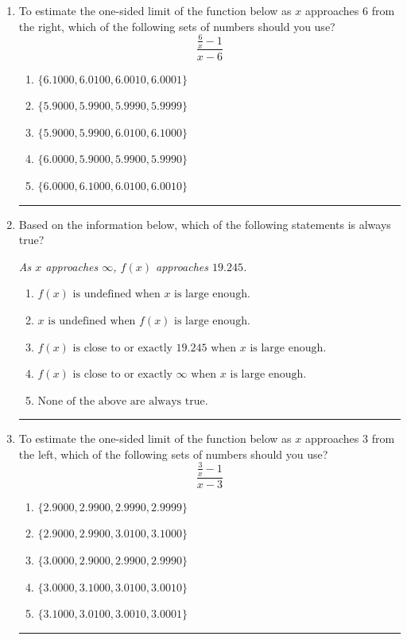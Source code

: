 \documentclass[14pt]{extbook}
\newcommand{\litem}[1]{\item#1\hspace*{-1cm}\rule{\textwidth}{0.4pt}}
\begin{document}
\begin{enumerate}
\litem{
To estimate the one-sided limit of the function below as $x$ approaches 6 from the right, which of the following sets of numbers should you use?\[ \frac{\frac{6}{x} - 1}{x - 6} \]\begin{enumerate}[label=\Alph*.]
\item \( \{ 6.1000, 6.0100, 6.0010, 6.0001 \} \)
\item \( \{ 5.9000, 5.9900, 5.9990, 5.9999 \} \)
\item \( \{ 5.9000, 5.9900, 6.0100, 6.1000 \} \)
\item \( \{ 6.0000, 5.9000, 5.9900, 5.9990 \} \)
\item \( \{ 6.0000, 6.1000, 6.0100, 6.0010 \} \)

\end{enumerate} }
\litem{
Based on the information below, which of the following statements is always true?
\begin{center}
    \textit{ As $x$ approaches $\infty$, $f(x)$ approaches $19.245$. }
\end{center}
\begin{enumerate}[label=\Alph*.]
\item \( f(x) \text{ is undefined when } x \text{ is large enough}. \)
\item \( x \text{ is undefined when } f(x) \text{ is large enough}. \)
\item \( f(x) \text{ is close to or exactly } 19.245 \text{ when } x \text{ is large enough}. \)
\item \( f(x) \text{ is close to or exactly } \infty \text{ when } x \text{ is large enough}. \)
\item \( \text{None of the above are always true.} \)

\end{enumerate} }
\litem{
To estimate the one-sided limit of the function below as $x$ approaches 3 from the left, which of the following sets of numbers should you use?\[ \frac{\frac{3}{x} - 1}{x - 3} \]\begin{enumerate}[label=\Alph*.]
\item \( \{ 2.9000, 2.9900, 2.9990, 2.9999 \} \)
\item \( \{ 2.9000, 2.9900, 3.0100, 3.1000 \} \)
\item \( \{ 3.0000, 2.9000, 2.9900, 2.9990 \} \)
\item \( \{ 3.0000, 3.1000, 3.0100, 3.0010 \} \)
\item \( \{ 3.1000, 3.0100, 3.0010, 3.0001 \} \)


\end{enumerate}}
\end{enumerate}
\end{document}
